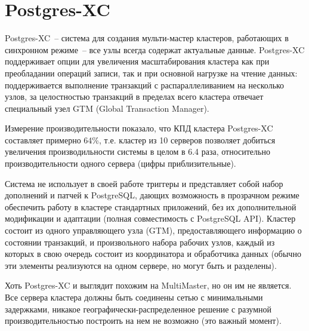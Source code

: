 \section{Postgres-XC}
\label{sec:postgres-xc}

Postgres-XC~-- система для создания мульти-мастер кластеров, работающих в синхронном режиме~-- все узлы всегда содержат актуальные данные. Postgres-XC поддерживает опции для увеличения масштабирования кластера как при преобладании операций записи, так и при основной нагрузке на чтение данных: поддерживается выполнение транзакций с распараллеливанием на несколько узлов, за целостностью транзакций в пределах всего кластера отвечает специальный узел GTM (Global Transaction Manager).

Измерение производительности показало, что КПД кластера Postgres-XC составляет примерно 64\%, т.е. кластер из 10 серверов позволяет добиться увеличения производильности системы в целом в 6.4 раза, относительно производительности одного сервера (цифры приблизительные). 

Система не использует в своей работе триггеры и представляет собой набор дополнений и патчей к PostgreSQL, дающих возможность в прозрачном режиме обеспечить работу в кластере стандартных приложений, без их дополнительной модификации и адаптации (полная совместимость с PostgreSQL API). Кластер состоит из одного управляющего узла (GTM), предоставляющего информацию о состоянии транзакций, и произвольного набора рабочих узлов, каждый из которых в свою очередь состоит из координатора и обработчика данных (обычно эти элементы реализуются на одном сервере, но могут быть и разделены).

Хоть Postgres-XC и выглядит похожим на MultiMaster, но он им не является. Все сервера кластера должны быть соединены сетью с минимальными задержками, никакое географически-распределенное решение с разумной производительностью построить на нем не возможно (это важный момент).